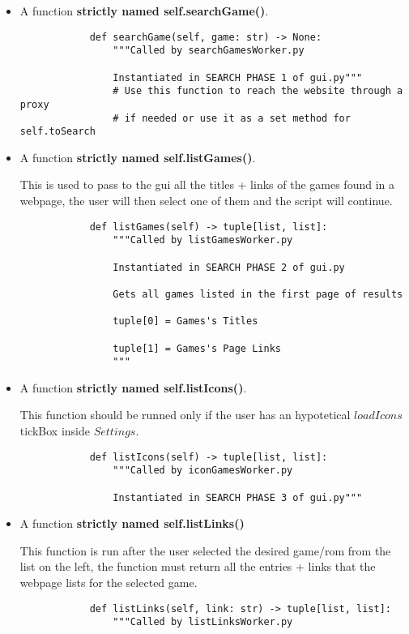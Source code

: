 \documentclass{article}
\begin{document}
\begin{itemize}
        \item A function \textbf{strictly named self.searchGame()}.
        \begin{verbatim}
            def searchGame(self, game: str) -> None:
                """Called by searchGamesWorker.py
                
                Instantiated in SEARCH PHASE 1 of gui.py"""
                # Use this function to reach the website through a proxy
                # if needed or use it as a set method for self.toSearch
        \end{verbatim}
        \item A function \textbf{strictly named self.listGames()}.
        
        This is used to pass to the gui all the titles + links of the games found in a webpage,
        the user will then select one of them and the script will continue.
        \begin{verbatim}
            def listGames(self) -> tuple[list, list]:
                """Called by listGamesWorker.py
                
                Instantiated in SEARCH PHASE 2 of gui.py

                Gets all games listed in the first page of results

                tuple[0] = Games's Titles

                tuple[1] = Games's Page Links
                """
        \end{verbatim}
        \item A function \textbf{strictly named self.listIcons()}.
        
        This function should be runned only if the user has an hypotetical $loadIcons$ tickBox inside $Settings$.
        \begin{verbatim}
            def listIcons(self) -> tuple[list, list]:
                """Called by iconGamesWorker.py
                    
                Instantiated in SEARCH PHASE 3 of gui.py"""
        \end{verbatim}
        \item A function \textbf{strictly named self.listLinks()}
        
        This function is run after the user selected the desired game/rom from the list on the left, the function must return all the entries + links that the webpage lists for the selected game.
        \begin{verbatim}
            def listLinks(self, link: str) -> tuple[list, list]:
                """Called by listLinksWorker.py
                

\end{verbatim}
\end{itemize}
\end{document}
